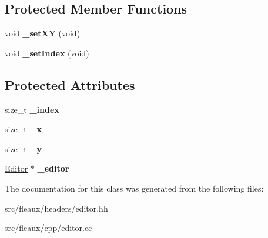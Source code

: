 \subsection*{Protected Member Functions}
\begin{DoxyCompactItemize}
\item 
\hypertarget{classFleaux_1_1Cursor_a3a45b2bde24c3173e84b8097c789265b}{}void {\bfseries \+\_\+set\+X\+Y} (void)\label{classFleaux_1_1Cursor_a3a45b2bde24c3173e84b8097c789265b}

\item 
\hypertarget{classFleaux_1_1Cursor_a964ad98494b190af5fca13c8cbe69371}{}void {\bfseries \+\_\+set\+Index} (void)\label{classFleaux_1_1Cursor_a964ad98494b190af5fca13c8cbe69371}

\end{DoxyCompactItemize}
\subsection*{Protected Attributes}
\begin{DoxyCompactItemize}
\item 
\hypertarget{classFleaux_1_1Cursor_ac73c77f866d9fd3ce6ac74f458f899b5}{}size\+\_\+t {\bfseries \+\_\+index}\label{classFleaux_1_1Cursor_ac73c77f866d9fd3ce6ac74f458f899b5}

\item 
\hypertarget{classFleaux_1_1Cursor_acbb4e71f0e8fe82c57d4046d708e94c8}{}size\+\_\+t {\bfseries \+\_\+x}\label{classFleaux_1_1Cursor_acbb4e71f0e8fe82c57d4046d708e94c8}

\item 
\hypertarget{classFleaux_1_1Cursor_ae31481eee36242bfcb286fb03cb6c9d9}{}size\+\_\+t {\bfseries \+\_\+y}\label{classFleaux_1_1Cursor_ae31481eee36242bfcb286fb03cb6c9d9}

\item 
\hypertarget{classFleaux_1_1Cursor_ae65c902eba05392c7db5cb8956af441d}{}\hyperlink{classFleaux_1_1Editor}{Editor} $\ast$ {\bfseries \+\_\+editor}\label{classFleaux_1_1Cursor_ae65c902eba05392c7db5cb8956af441d}

\end{DoxyCompactItemize}


The documentation for this class was generated from the following files\+:\begin{DoxyCompactItemize}
\item 
src/fleaux/headers/editor.\+hh\item 
src/fleaux/cpp/editor.\+cc\end{DoxyCompactItemize}
